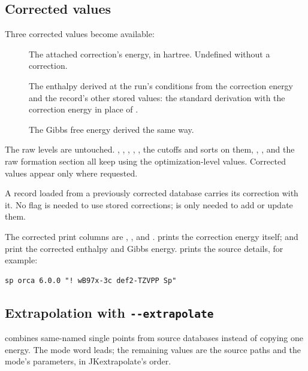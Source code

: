 \subsection{Corrected values}\label{sec:corrected-values}

Three corrected values become available:

\begin{description}
  \item[] The attached correction's energy, in hartree.
        Undefined without a correction.
  \item[] The enthalpy derived at the run's conditions from the
        correction energy and the record's other stored values: the standard
        derivation with the correction energy in place of
        .
  \item[] The Gibbs free energy derived the same way.
\end{description}

The raw levels are untouched. , , , ,
, the cutoffs and sorts on them, , , and the
raw formation section all keep using the optimization-level values.
Corrected values appear only where requested.

\begin{note}
A record loaded from a previously corrected database carries its correction
with it. No flag is needed to use stored corrections; 
is only needed to add or update them.
\end{note}

The corrected print columns are , , and
.  prints the correction energy itself;
 and  print the corrected enthalpy and Gibbs
energy.  prints the source details, for example:

\begin{verbatim}
sp orca 6.0.0 "! wB97x-3c def2-TZVPP Sp"
\end{verbatim}

\subsection{Extrapolation with \texttt{-{}-extrapolate}}\label{sec:extrapolation}

 combines same-named single points from source databases
instead of copying one energy. The mode word leads; the remaining values are
the source paths and the mode's parameters, in JKextrapolate's order.

